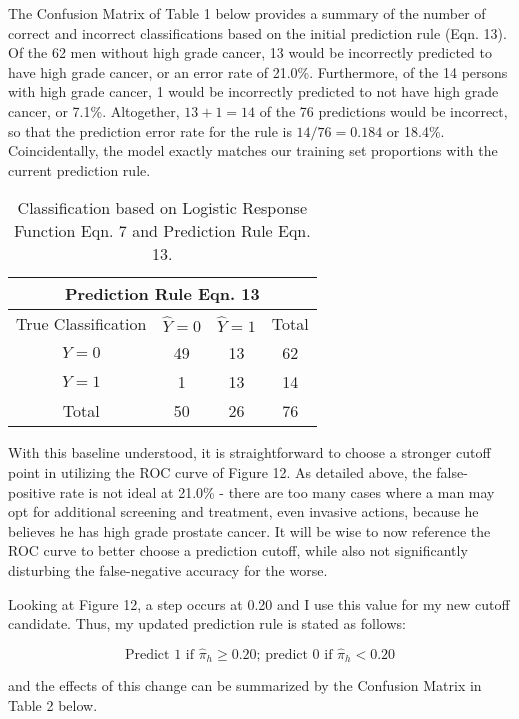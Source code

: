 The Confusion Matrix of Table 1 below provides a summary of the number of correct and incorrect classifications based on the initial prediction rule (Eqn. 13). Of the 62 men without high grade cancer, 13 would be incorrectly predicted to have high grade cancer, or an error rate of 21.0\%. Furthermore, of the 14 persons with high grade cancer, 1 would be incorrectly predicted to not have high grade cancer, or 7.1\%. Altogether, \(13+1=14\) of the 76 predictions would be incorrect, so that the prediction error rate for the rule is \(14/76=0.184\) or 18.4\%. Coincidentally, the model exactly matches our training set proportions with the current prediction rule. \par

\begin{table}[H]
	\centering
	\begin{tabular}{ |c||c|c||c|  }
 	\hline
 	\multicolumn{4}{|c|}{Prediction Rule Eqn. 13} \\
 	\hline\hline
 	True Classification&\(\hat{Y}=0\)&\(\hat{Y}=1\)&Total\\
 	\hline
 	\(Y=0\)&49&13&62\\
 	\(Y=1\)&1&13&14\\
 	\hline\hline
 	Total&50&26&76\\
 	\hline
	\end{tabular}
 	\caption{Classification based on Logistic Response Function Eqn. 7 and Prediction Rule Eqn. 13.}
\end{table}

\pagebreak
With this baseline understood, it is straightforward to choose a stronger cutoff point in utilizing the ROC curve of Figure 12. As detailed above, the false-positive rate is not ideal at 21.0\% - there are too many cases where a man may opt for additional screening and treatment, even invasive actions, because he believes he has high grade prostate cancer. It will be wise to now reference the ROC curve to better choose a prediction cutoff, while also not significantly disturbing the false-negative accuracy for the worse. \par
Looking at Figure 12, a step occurs at 0.20 and I use this value for my new cutoff candidate. Thus, my updated prediction rule is stated as follows:

\begin{equation}
	\textrm{Predict 1 if } \hat{\pi}_h \geq 0.20\textrm{; predict 0 if } \hat{\pi}_h < 0.20
\end{equation}

and the effects of this change can be summarized by the Confusion Matrix in Table 2 below.

